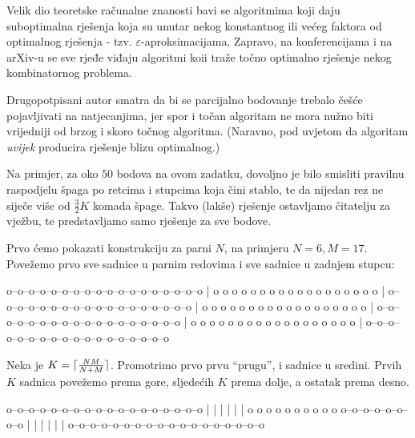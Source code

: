 Velik dio teoretske računalne znanosti bavi se algoritmima koji daju
suboptimalna rješenja koja su unutar nekog konstantnog ili većeg faktora
od optimalnog rješenja - tzv. $\varepsilon$-aproksimacijama. 
Zapravo, na konferencijama i na arXiv-u se sve rjeđe viđaju
algoritmi koii traže točno optimalno rješenje nekog kombinatornog problema.

Drugopotpisani autor smatra da bi se parcijalno bodovanje trebalo češće 
pojavljivati na natjecanjima, jer spor i točan algoritam ne mora nužno
biti vrijedniji od brzog i skoro točnog algoritma. (Naravno, pod uvjetom
da algoritam \textit{uvijek} producira rješenje blizu optimalnog.)

Na primjer, za oko $50$ bodova na ovom zadatku, dovoljno je bilo smisliti 
pravilnu raspodjelu špaga po retcima i stupcima koja čini stablo, te da
nijedan rez ne siječe više od $\frac{3}{2} K$ komada špage. Takvo 
(lakše) rješenje ostavljamo čitatelju za vježbu, te predstavljamo samo
rješenje za sve bodove.

Prvo ćemo pokazati konstrukciju za parni $N$, na primjeru $N = 6, M = 17$.
Povežemo prvo sve sadnice u parnim redovima i sve sadnice u zadnjem stupcu:
\begin{verbbox}
o--o--o--o--o--o--o--o--o--o--o--o--o--o--o--o--o--o
                                                   |
o  o  o  o  o  o  o  o  o  o  o  o  o  o  o  o  o  o
                                                   |
o--o--o--o--o--o--o--o--o--o--o--o--o--o--o--o--o--o
                                                   |
o  o  o  o  o  o  o  o  o  o  o  o  o  o  o  o  o  o
                                                   |
o--o--o--o--o--o--o--o--o--o--o--o--o--o--o--o--o--o
                                                   |
o  o  o  o  o  o  o  o  o  o  o  o  o  o  o  o  o  o
                                                   |
o--o--o--o--o--o--o--o--o--o--o--o--o--o--o--o--o--o
\end{verbbox}
\begin{figure}[H]
  \centering
  \theverbbox
\end{figure}

Neka je $K = \lceil\frac{NM}{N + M}\rceil$. Promotrimo prvo
prvu ``prugu'', i sadnice u sredini. Prvih $K$ sadnica povežemo prema gore,
sljedećih $K$ prema dolje, a ostatak prema desno.

\begin{verbbox}
o--o--o--o--o--o--o--o--o--o--o--o--o--o--o--o--o--o
|  |  |  |  |                                      |
o  o  o  o  o  o  o  o  o  o  o--o--o--o--o--o--o--o
               |  |  |  |  |                       |
o--o--o--o--o--o--o--o--o--o--o--o--o--o--o--o--o--o
\end{verbbox}
\begin{figure}[H]
  \centering
  \theverbbox
\end{figure}

